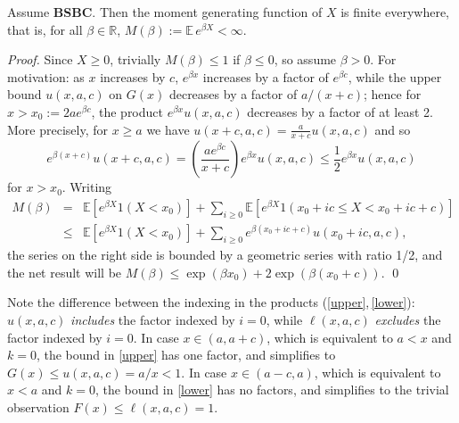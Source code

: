 \documentclass[smallextended,envcountsect]{svjour3}
\begin{document}
\begin{corollary}\label{cor mgf}  Assume {\bf BSBC}.  Then the moment generating function of $X$ is finite everywhere, that is, for all $\beta \in {\mathbb{R}}$, $M(\beta) := {\mathbb{E \,}} e^{\beta X} < \infty$.
\end{corollary}
\begin{proof}
Since $X \ge 0$, trivially $M(\beta) \le 1$ if $\beta \le 0$, so assume  $\beta > 0$.  For motivation:  as $x$ increases by $c$, $e^{\beta  x}$ increases by a factor of $e^{\beta c}$, while the upper bound $u(x,a,c)$ on $G(x)$ decreases by a factor of
$a/(x+c)$;  hence for $x > x_0 := 2 a e^{\beta c}$, the product $e^{\beta  x} u(x,a,c)$ decreases by a factor of at least 2.  More precisely, for $x \ge a$ we have $u(x+c,a,c) = \frac{a}{x+c}u(x,a,c)$ and so
   $$
   e^{\beta(x+c)}u(x+c,a,c) = \left(\frac{ae^{\beta c}}{x+c}\right) e^{\beta x}u(x,a,c) \le \frac{1}{2} e^{\beta x} u(x,a,c)
   $$
for $x > x_0$.   Writing
   \begin{eqnarray*}
    M(\beta) & = & \mathbb{E}\left[ e^{\beta X}1(X < x_0)\right] + \sum_{i \ge 0} \mathbb{E} \left[e^{\beta X}1(x_0+ic \le X < x_0+ic+c)\right]\\
      & \le & \mathbb{E}\left[ e^{\beta X}1(X < x_0)\right] + \sum_{i \ge 0} e^{\beta(x_0+ic+c)} u(x_0+ic,a,c),
  \end{eqnarray*}
the series on the right side is bounded by a geometric series with ratio 1/2, and the net result will be
$M(\beta) \le  \exp(\beta x_0) + 2 \exp(\beta(x_0+c))$.
\qed \end{proof}

\begin{remark} \label{rem include}  Note the difference between the indexing in the products (\ref{upper},\,\ref{lower}): $u(x,a,c)$ \emph{includes} the factor indexed by $i=0$, while $\ell(x,a,c)$ \emph{excludes} the factor indexed by $i=0$.  In case  $x \in (a,a+c)$, which is equivalent to $a < x$ and $k=0$, the bound in \eqref{upper} has one factor, and simplifies to $G(x) \le u(x,a,c) = a/x < 1$.  In case $x \in (a-c,a)$, which is equivalent to $x < a$ and $k=0$, the bound in \eqref{lower} has no factors, and simplifies to the trivial observation $F(x) \le \ell(x,a,c)=1$.
\end{remark}
\end{document}
